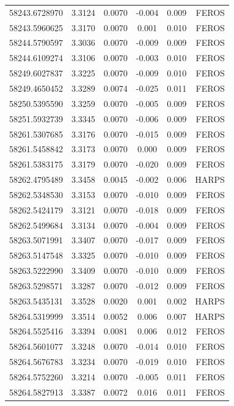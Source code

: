 \documentclass[useAMS,usenatbib]{mnras}
\begin{document}
\begin{table}
\begin{tabular}{@{}lccccr@{}}
58243.6728970 & 3.3124 & 0.0070 & -0.004 & 0.009 & FEROS \\
58243.5960625 & 3.3170 & 0.0070 &  0.001 & 0.010 & FEROS \\
58244.5790597 & 3.3036 & 0.0070 & -0.009 & 0.009 & FEROS \\
58244.6109274 & 3.3106 & 0.0070 & -0.003 & 0.010 & FEROS \\
58249.6027837 & 3.3225 & 0.0070 & -0.009 & 0.010 & FEROS \\
58249.4650452 & 3.3289 & 0.0074 & -0.025 & 0.011 & FEROS \\
58250.5395590 & 3.3259 & 0.0070 & -0.005 & 0.009 & FEROS \\
58251.5932739 & 3.3345 & 0.0070 & -0.006 & 0.009 & FEROS \\
58261.5307685 & 3.3176 & 0.0070 & -0.015 & 0.009 & FEROS \\
58261.5458842 & 3.3173 & 0.0070 &  0.000 & 0.009 & FEROS \\
58261.5383175 & 3.3179 & 0.0070 & -0.020 & 0.009 & FEROS \\
58262.4795489 & 3.3458 & 0.0045 & -0.002 & 0.006 & HARPS \\
58262.5348530 & 3.3153 & 0.0070 & -0.010 & 0.009 & FEROS \\
58262.5424179 & 3.3121 & 0.0070 & -0.018 & 0.009 & FEROS \\
58262.5499684 & 3.3134 & 0.0070 & -0.004 & 0.009 & FEROS \\
58263.5071991 & 3.3407 & 0.0070 & -0.017 & 0.009 & FEROS \\
58263.5147548 & 3.3325 & 0.0070 & -0.010 & 0.009 & FEROS \\
58263.5222990 & 3.3409 & 0.0070 & -0.010 & 0.009 & FEROS \\
58263.5298571 & 3.3287 & 0.0070 & -0.012 & 0.009 & FEROS \\
58263.5435131 & 3.3528 & 0.0020 &  0.001 & 0.002 & HARPS \\
58264.5319999 & 3.3514 & 0.0052 &  0.006 & 0.007 & HARPS \\
58264.5525416 & 3.3394 & 0.0081 &  0.006 & 0.012 & FEROS \\
58264.5601077 & 3.3248 & 0.0070 & -0.014 & 0.010 & FEROS \\
58264.5676783 & 3.3234 & 0.0070 & -0.019 & 0.010 & FEROS \\
58264.5752260 & 3.3214 & 0.0070 & -0.005 & 0.011 & FEROS \\
58264.5827913 & 3.3387 & 0.0072 &  0.016 & 0.011 & FEROS \\

\end{tabular}
\end{table}
\end{document}
